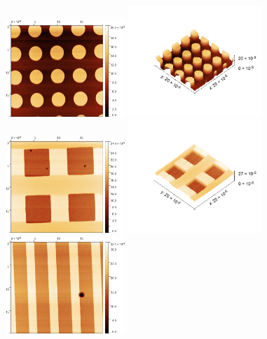        \begin{figure}
            \centering
            \includegraphics[width = 0.40\textwidth]{pictures/Kreis.png}
            \includegraphics[width = 0.45\textwidth]{pictures/Kreis3D.png}
            \includegraphics[width = 0.40\textwidth]{pictures/Quadrat.png}
            \includegraphics[width = 0.45\textwidth]{pictures/Quadrat3D.png}
            \includegraphics[width = 0.40\textwidth]{pictures/Linie.png}

\end{figure}
